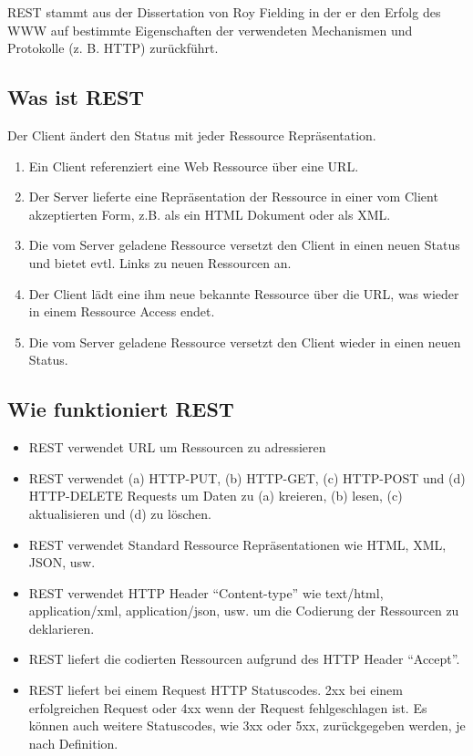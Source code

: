 \documentclass[abstracton, listof=totocnumbered,
bibliography=totocnumbered]{scrreprt}
\begin{document}
  \ac{REST} stammt aus der Dissertation von Roy Fielding in der er den Erfolg
  des \ac{WWW} auf bestimmte Eigenschaften der verwendeten Mechanismen und
  Protokolle (z. B. \ac{HTTP}) zurückführt.
  
  \subsection{Was ist REST}
  
  Der Client ändert den Status mit jeder Ressource Repräsentation.
  
  \begin{enumerate}
    \item Ein Client referenziert eine Web Ressource über eine \ac{URL}.
    \item Der Server lieferte eine Repräsentation der Ressource in einer vom
    Client akzeptierten Form, z.B. als ein \ac{HTML} Dokument oder als \ac{XML}.
    \item Die vom Server geladene Ressource versetzt den Client in einen neuen
    Status und bietet evtl. Links zu neuen Ressourcen an.
    \item Der Client lädt eine ihm neue bekannte Ressource über die \ac{URL},
    was wieder in einem Ressource Access endet.
    \item Die vom Server geladene Ressource versetzt den Client wieder in einen
    neuen Status.
  \end{enumerate}
  
  \subsection{Wie funktioniert REST}
  
  \begin{itemize}
    \item \ac{REST} verwendet \ac{URL} um Ressourcen zu adressieren
    \item \ac{REST} verwendet (a) HTTP-PUT, (b) HTTP-GET, (c) HTTP-POST und
    (d) HTTP-DELETE Requests um Daten zu (a) kreieren, (b) lesen,
    (c) aktualisieren und (d) zu löschen.
    \item \ac{REST} verwendet Standard Ressource Repräsentationen wie \ac{HTML},
    \ac{XML}, \ac{JSON}, usw.
    \item \ac{REST} verwendet \ac{HTTP} Header ``Content-type'' wie text/html,
    application/xml, application/json, usw. um die Codierung der Ressourcen zu
    deklarieren.
    \item \ac{REST} liefert die codierten Ressourcen aufgrund des \ac{HTTP} Header
    ``Accept''.
    \item \ac{REST} liefert bei einem Request \ac{HTTP} Statuscodes. 2xx bei einem
    erfolgreichen Request oder 4xx wenn der Request fehlgeschlagen ist. Es
    können auch weitere Statuscodes, wie 3xx oder 5xx, zurückgegeben werden, je
    nach Definition.
  \end{itemize}
  
\end{document}
